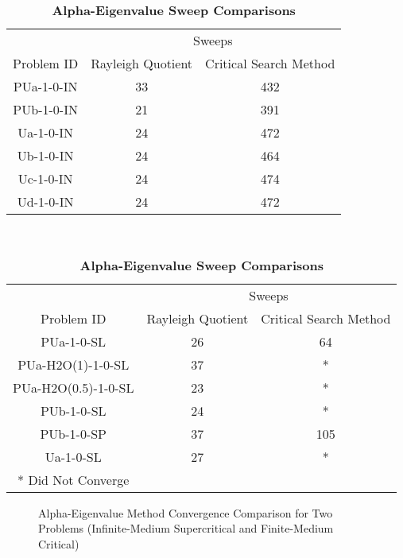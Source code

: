 \begin{table}[]
    \centering
    \caption{\textbf{Alpha-Eigenvalue Sweep Comparisons}}
    \label{table:alph}
    \begin{subtable}{\linewidth}
    \centering
    \begin{tabular}{*3c}
        \toprule
        & \multicolumn{2}{c}{Sweeps} \\
        \cmidrule(lr){2-3}
        Problem ID & Rayleigh Quotient & Critical Search Method\\    
        \midrule
        PUa-1-0-IN & 33 & 432 \\
        PUb-1-0-IN & 21 & 391   \\
	Ua-1-0-IN & 24 & 472\\
	Ub-1-0-IN & 24 & 464 \\
	Uc-1-0-IN & 24 & 474 \\
	Ud-1-0-IN & 24 & 472\\
        \bottomrule
    \end{tabular}
    \end{subtable} \\
    \centering
    \begin{subtable}{\linewidth}
    \centering
    \begin{tabular}{*3c}
        \toprule
        & \multicolumn{2}{c}{Sweeps} \\
        \cmidrule(lr){2-3}
        Problem ID & Rayleigh Quotient & Critical Search Method \\    
        \midrule
        PUa-1-0-SL & 26 & 64 \\
	\small PUa-H2O(1)-1-0-SL & 37 & *      \\
	\small PUa-H2O(0.5)-1-0-SL & 23 & *    \\
	PUb-1-0-SL & 24 & * \\
        PUb-1-0-SP & 37 & 105 \\
	Ua-1-0-SL & 27 & * \\
        \bottomrule
	* Did Not Converge & &
    \end{tabular}
    \end{subtable}
\end{table}

\begin{figure}[]
	\centering
	\begin{subfigure}{\textwidth}
	\resizebox{\textwidth}{0.45\textheight}{
		
	}
	\end{subfigure}
	\begin{subfigure}{\textwidth}
	\centering
	\resizebox{\textwidth}{0.45\textheight}{
		
	}
	\end{subfigure}
	\caption{Alpha-Eigenvalue Method Convergence Comparison for Two Problems (Infinite-Medium Supercritical and Finite-Medium Critical)}
	\label{fig:aRes}
\end{figure}

